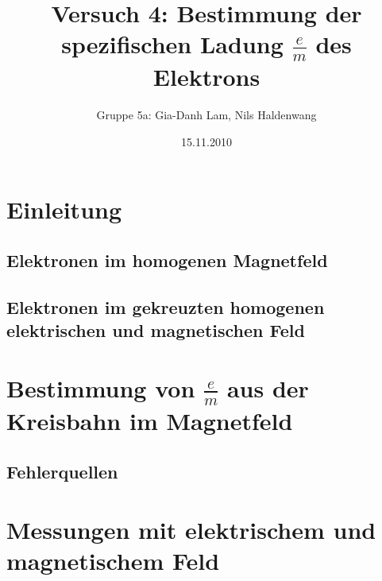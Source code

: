 \documentclass{scrartcl}
\begin{document}
\title{Versuch 4: Bestimmung der spezifischen Ladung $\frac{e}{m}$ des
Elektrons}

\date{15.11.2010}

\author{Gruppe 5a: Gia-Danh Lam, Nils Haldenwang}

\maketitle
\tableofcontents

\section{Einleitung}
\label{sec:einleitung}

\subsection{Elektronen im homogenen Magnetfeld}
\label{sec:elektr-im-homog}

\subsection{Elektronen im gekreuzten homogenen elektrischen und magnetischen Feld}
\label{sec:elektr-im-gekr}

\section{Bestimmung von $\frac{e}{m}$ aus der Kreisbahn im Magnetfeld}
\label{sec:best-von-frac}

\subsection{Fehlerquellen}
\label{sec:fehlerquellen}

\section{Messungen mit elektrischem und magnetischem Feld}
\label{sec:mess-mit-elektr}
\end{document}
